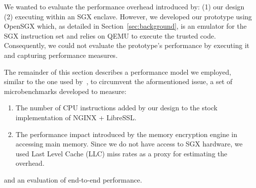 \documentclass[../../main.tex]{subfiles}
\begin{document}
We wanted to evaluate the performance overhead introduced by: (1) our
design (2) executing within an SGX enclave. However, we developed our
prototype using OpenSGX which, as detailed in
Section~\ref{sec:background}, is an emulator for the SGX instruction
set and relies on QEMU to execute the trusted code. Consequently, we
could not evaluate the prototype's performance by executing it and
capturing performance measures.

The remainder of this section describes a performance model we
employed, similar to the one used by~\cite{Baumann14}, to circumvent
the aformentioned issue, a set of microbenchmarks developed to
measure:
\begin{enumerate}
  \item The number of CPU instructions added by our design to the
    stock implementation of NGINX + LibreSSL.
  \item The performance impact introduced by the memory encryption
    engine in accessing main memory. Since we do not have access to SGX
    hardware, we used Last Level Cache (LLC) miss rates as a proxy for
    estimating the overhead.
\end{enumerate}
and an evaluation of end-to-end performance.
\end{document}
